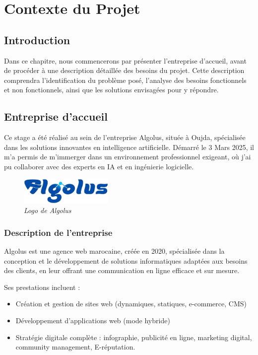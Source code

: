\documentclass[12pt,a4paper]{report}
\begin{document}
	\chapter{Contexte du Projet}
	
	\section{Introduction}
	
	Dans ce chapitre, nous commencerons par présenter l’entreprise d’accueil, avant de procéder à une description détaillée des besoins du projet. Cette description comprendra l’identification du problème posé, l’analyse des besoins fonctionnels et non fonctionnels, ainsi que les solutions envisagées pour y répondre.
	
	\section{Entreprise d’accueil}
	
	Ce stage a été réalisé au sein de l’entreprise Algolus, située à Oujda, spécialisée dans les solutions innovantes en intelligence artificielle. Démarré le 3 Mars 2025, il m’a permis de m’immerger dans un environnement professionnel exigeant, où j’ai pu collaborer avec des experts en IA et en ingénierie logicielle.
	
	\begin{figure}[H]
		\centering
		\includegraphics[width=0.4\textwidth]{algolus-logo.png}
		\caption{\textit{Logo de Algolus}}
		\label{fig:algolus-logo}
	\end{figure}
	
	\subsection{Description de l’entreprise}
	
	Algolus est une agence web marocaine, créée en 2020, spécialisée dans la conception et le développement de solutions informatiques adaptées aux besoins des clients, en leur offrant une communication en ligne efficace et sur mesure.
	
	Ses prestations incluent :
	
	\renewcommand{\labelitemi}{$\bullet$}
	\begin{itemize}
		\item Création et gestion de sites web (dynamiques, statiques, e-commerce, CMS)
		\item Développement d'applications web (mode hybride)
		\item Stratégie digitale complète : infographie, publicité en ligne, marketing digital, community management, E-réputation.
	\end{itemize}
	
\end{document}
